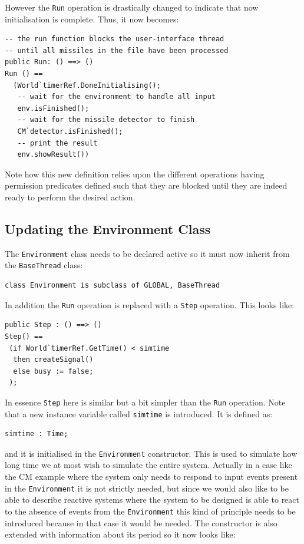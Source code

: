 \documentclass{overturerepchap}
\begin{document}

However the \texttt{Run} operation is drastically changed to indicate that now initialisation is complete. Thus, it now becomes:

\begin{lstlisting}
-- the run function blocks the user-interface thread
-- until all missiles in the file have been processed
public Run: () ==> ()
Run () == 
  (World`timerRef.DoneInitialising();
   -- wait for the environment to handle all input
   env.isFinished();
   -- wait for the missile detector to finish
   CM`detector.isFinished();
   -- print the result
   env.showResult())
\end{lstlisting}

Note how this new definition relies upon the different operations
having permission predicates defined such that they are blocked until
they are indeed ready to perform the desired action.

\subsection{Updating the Environment Class}

The \texttt{Environment} class needs to be declared active so it must 
now inherit from the \texttt{BaseThread} class:

\begin{lstlisting}
class Environment is subclass of GLOBAL, BaseThread
\end{lstlisting}

In addition the \texttt{Run} operation is
replaced with a \texttt{Step} operation. This looks like:

\begin{lstlisting}
public Step : () ==> ()
Step() ==
 (if World`timerRef.GetTime() < simtime
  then createSignal()
  else busy := false;
 );
\end{lstlisting}

In essence \texttt{Step} here is similar but a bit simpler than the
\texttt{Run} operation. Note that a
new instance variable called \texttt{simtime} is introduced. It is
defined as:

\begin{lstlisting}
simtime : Time;
\end{lstlisting}
and it is initialised in the \texttt{Environment} constructor. This
is used to simulate how long time we at most wish to simulate the
entire system. Actually in a case like the CM example where the system
only needs to respond to input events present in the
\texttt{Environment} it is not strictly needed, but since we would
also like to be able to describe reactive systems where the system to
be designed is able to react to the absence of events from the
\texttt{Environment} this kind of principle needs to be introduced
because in that case it would be needed. The constructor is also extended 
with information about its period so it now looks like:
\end{document}
